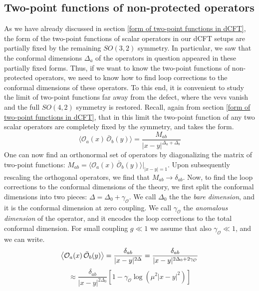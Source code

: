 \subsection{Two-point functions of non-protected operators}
As we have already discussed in section \ref{form of two-point functions in dCFT}, the form of the two-point functions of scalar operators in our dCFT setups are partially fixed by the remaining $SO(3,2)$ symmetry. In particular, we saw that the conformal dimensions $\Delta_a$ of the operators in question appeared in these partially fixed forms. Thus, if we want to know the two-point functions of non-protected operators, we need to know how to find loop corrections to the conformal dimensions of these operators. To this end, it is convenient to study the limit of two-point functions far away from the defect, where the vevs vanish and the full $SO(4,2)$ symmetry is restored. Recall, again from section \ref{form of two-point functions in dCFT}, that in this limit the two-point function of any two scalar operators are completely fixed by the symmetry, and takes the form.
%
%
\begin{equation}
\langle \mathcal{O}_a(x) \, \bar{\mathcal{O}}_b(y) \rangle
=
\frac{M_{ab}}{|x-y|^{\Delta_a + \Delta_b}}
\end{equation}
%
%
One can now find an orthonormal set of operators by diagonalizing the matrix of two-point functions: $M_{ab} = \langle \mathcal{O}_a(x) \, \bar{\mathcal{O}}_b(y) \rangle |_{|x-y|=1}$. Upon subsequently rescaling the orthogonal operators, we find that $M_{ab} \to \delta_{ab}$. Now, to find the loop corrections to the conformal dimensions of the theory, we first split the conformal dimensions into two pieces: $\Delta = \Delta_0 + \gamma_{\mathcal{O}}$. We call $\Delta_0$ the the \textit{bare dimension}, and it is the conformal dimension at zero coupling. We call $\gamma_{\mathcal{O}}$ the \textit{anomalous dimension} of the operator, and it encodes the loop corrections to the total conformal dimension. For small coupling $g \ll 1$ we assume that also $\gamma_{\mathcal{O}} \ll 1$, and we can write.
%
%
\begin{equation*}
\expval{\mathcal{O}_a(x) \, \bar{\mathcal{O}}_b(y)}
=
\frac{\delta_{ab}}{|x-y|^{2 \Delta}}
=
\frac{\delta_{ab}}{|x-y|^{2 \Delta_0 + 2 \gamma_{\mathcal{O}}}}
\end{equation*}
%
%
\begin{equation}\label{two-point function anomalous dimension}
\approx
\frac{\delta_{ab}}{|x-y|^{2 \Delta_0}}
\left[
1 - \gamma_{\mathcal{O}} \log( \mu^2 |x-y|^2 )
\right]
\end{equation}
